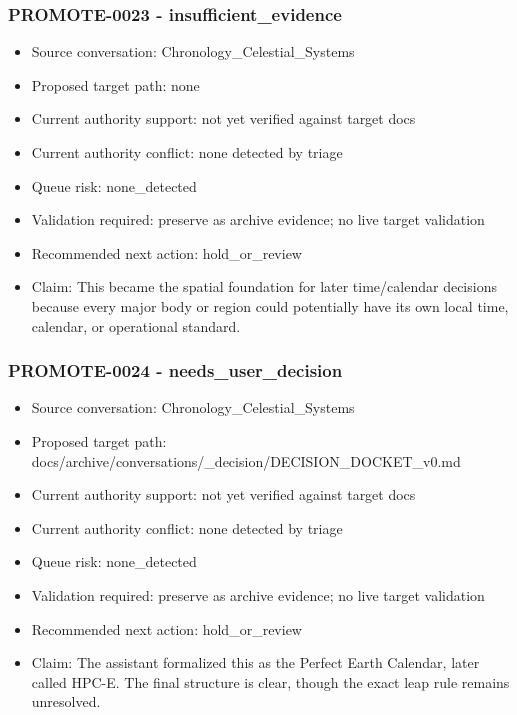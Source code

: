 \documentclass[11pt,a4paper]{report}
\begin{document}
\subsubsection{PROMOTE-0023 - insufficient\_evidence}

\begin{itemize}
\item Source conversation: Chronology\_Celestial\_Systems
\item Proposed target path: none
\item Current authority support: not yet verified against target docs
\item Current authority conflict: none detected by triage
\item Queue risk: none\_detected
\item Validation required: preserve as archive evidence; no live target validation
\item Recommended next action: hold\_or\_review
\item Claim: This became the spatial foundation for later time/calendar decisions because every major body or region could potentially have its own local time, calendar, or operational standard.
\end{itemize}

\subsubsection{PROMOTE-0024 - needs\_user\_decision}

\begin{itemize}
\item Source conversation: Chronology\_Celestial\_Systems
\item Proposed target path: docs/archive/conversations/\_decision/DECISION\_DOCKET\_v0.md
\item Current authority support: not yet verified against target docs
\item Current authority conflict: none detected by triage
\item Queue risk: none\_detected
\item Validation required: preserve as archive evidence; no live target validation
\item Recommended next action: hold\_or\_review
\item Claim: The assistant formalized this as the Perfect Earth Calendar, later called HPC-E. The final structure is clear, though the exact leap rule remains unresolved.
\end{itemize}
\end{document}

